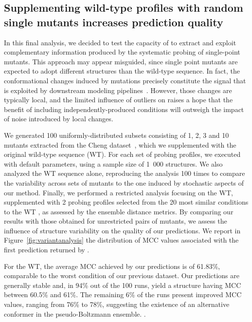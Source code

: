 \documentclass[a4,center,fleqn]{NAR}
\begin{document}
\subsection*{Supplementing wild-type profiles with random single mutants increases prediction quality}
In this final analysis, we decided to test the capacity of \OurTool to extract and exploit complementary information produced by the systematic probing of single-point mutants.
This approach may appear misguided, since single point mutants are expected to adopt different structures than the wild-type sequence. In fact, the conformational changes induced by mutations precisely constitute the signal that is exploited by downstream modeling pipelines~\cite{Cordero2015}. However, those changes are typically local, and the limited influence of outliers on \OurTool{} raises a hope that the benefit of including independently-produced conditions will outweigh the impact of noise introduced by local changes.

We generated 100 uniformly-distributed subsets consisting of 1, 2, 3 and 10 mutants extracted from the Cheng dataset~\cite{Cheng2017}, which we supplemented with the original wild-type sequence (WT).
For each set of probing profiles, we executed \OurTool{} with default parameters, using a sample size of 1~000 structures. 
We also analyzed the WT sequence alone, reproducing the analysis 100 times to compare the variability across sets of mutants to the one induced by stochastic aspects of our method. 
Finally, we performed a restricted analysis focusing on the WT, supplemented with 2 probing profiles selected from the 20 most similar conditions to the WT , as assessed by the ensemble distance metrics. By comparing our results with those obtained for unrestricted pairs of mutants, we assess the influence of structure variability on the quality of our predictions. We report in Figure~\ref{fig:variantanalysis} the distribution of MCC values associated with the first prediction returned by \OurTool.

For the WT, the average MCC achieved by our predictions is of 61.83\%, comparable to the worst condition of our previous dataset.
Our predictions are generally stable and, in 94\% out of the 100 runs, yield a structure having MCC between 60.5\% and 61\%. The remaining 6\% of the runs present improved MCC values, ranging from 76\% to 78\%, suggesting the existence of an alternative conformer in the pseudo-Boltzmann ensemble.
.%
\end{document}
